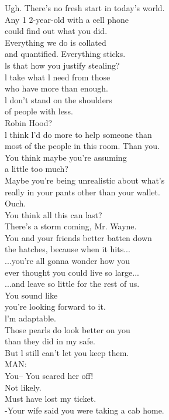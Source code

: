 \documentclass{article}
\begin{document}
\begin{multicols}{3}
Ugh. There's no fresh start in today's world.\\
Any 1 2-year-old with a cell phone\\
could find out what you did.\\
Everything we do is collated\\
and quantified. Everything sticks.\\
ls that how you justify stealing?\\
l take what l need from those\\
who have more than enough.\\
l don't stand on the shoulders\\
of people with less.\\
Robin Hood?\\
l think l'd do more to help someone than\\
most of the people in this room. Than you.\\
You think maybe you're assuming\\
a little too much?\\
Maybe you're being unrealistic about what's\\
really in your pants other than your wallet.\\
Ouch.\\
You think all this can last?\\
There's a storm coming, Mr. Wayne.\\
You and your friends better batten down\\
the hatches, because when it hits...\\
...you're all gonna wonder how you\\
ever thought you could live so large...\\
...and leave so little for the rest of us.\\
You sound like\\
you're looking forward to it.\\
l'm adaptable.\\
Those pearls do look better on you\\
than they did in my safe.\\
But l still can't let you keep them.\\
MAN:\\
You-- You scared her off!\\
Not likely.\\
Must have lost my ticket.\\
-Your wife said you were taking a cab home.\\

\end{multicols}
\end{document}
